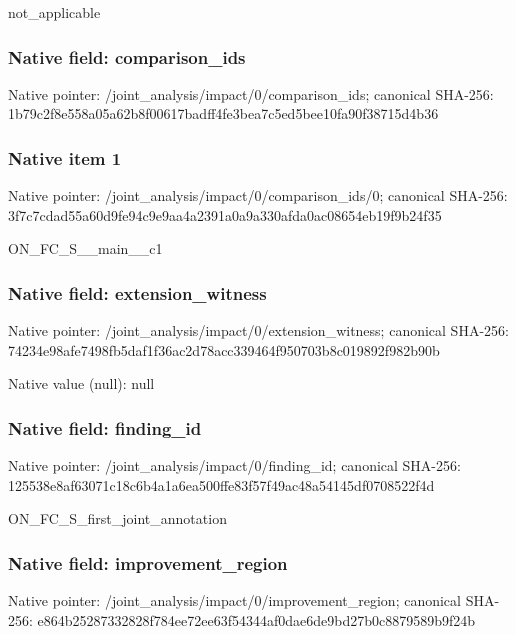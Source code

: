 \documentclass[10pt,a4paper]{article}
\begin{document}
\begingroup\raggedright\sloppy not\_\allowbreak{}applicable\par\endgroup

\subsubsection{Native field: comparison\_\allowbreak{}ids}
Native pointer: /joint\_\allowbreak{}analysis/impact/0/comparison\_\allowbreak{}ids; canonical SHA-256: 1b79c2f8e558a05a62b8f00617badff4fe3bea7c5ed5bee10fa90f38715d4b36

\subsubsection{Native item 1}
Native pointer: /joint\_\allowbreak{}analysis/impact/0/comparison\_\allowbreak{}ids/0; canonical SHA-256: 3f7c7cdad55a60d9fe94c9e9aa4a2391a0a9a330afda0ac08654eb19f9b24f35

\begingroup\raggedright\sloppy ON\_\allowbreak{}FC\_\allowbreak{}S\_\allowbreak{}\_\allowbreak{}main\_\allowbreak{}\_\allowbreak{}c1\par\endgroup

\subsubsection{Native field: extension\_\allowbreak{}witness}
Native pointer: /joint\_\allowbreak{}analysis/impact/0/extension\_\allowbreak{}witness; canonical SHA-256: 74234e98afe7498fb5daf1f36ac2d78acc339464f950703b8c019892f982b90b

Native value (null): null

\subsubsection{Native field: finding\_\allowbreak{}id}
Native pointer: /joint\_\allowbreak{}analysis/impact/0/finding\_\allowbreak{}id; canonical SHA-256: 125538e8af63071c18c6b4a1a6ea500ffe83f57f49ac48a54145df0708522f4d

\begingroup\raggedright\sloppy ON\_\allowbreak{}FC\_\allowbreak{}S\_\allowbreak{}first\_\allowbreak{}joint\_\allowbreak{}annotation\par\endgroup

\subsubsection{Native field: improvement\_\allowbreak{}region}
Native pointer: /joint\_\allowbreak{}analysis/impact/0/improvement\_\allowbreak{}region; canonical SHA-256: e864b25287332828f784ee72ee63f54344af0dae6de9bd27b0c8879589b9f24b
\end{document}
